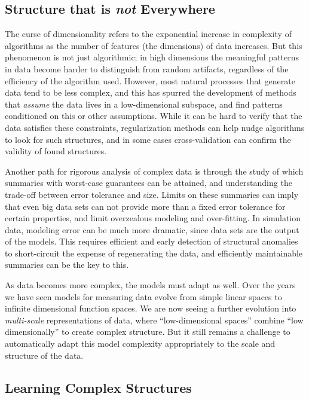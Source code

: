 \documentclass{article}
\begin{document}
\subsection*{Structure that is \emph{not} Everywhere}

The curse of dimensionality refers to the exponential increase in complexity of algorithms as the number of features (the dimensions) of data increases.  But this phenomenon is not just algorithmic; in high dimensions the meaningful patterns in data become harder to distinguish from random artifacts, regardless of the efficiency of the algorithm used.  
However, most natural processes that generate data tend to be less complex, and this has spurred the development of methods that \emph{assume} the data lives in a low-dimensional subspace, and find patterns conditioned on this or other assumptions.  While it can be hard to verify that the data satisfies these constraints, regularization methods can help nudge algorithms to look for such structures, and in some cases cross-validation can confirm the validity of found structures.  

Another path for rigorous analysis of complex data is through the study of which summaries with worst-case guarantees can be attained, and understanding the trade-off between error tolerance and size.  Limits on these summaries can imply that even big data sets can not provide more than a fixed error tolerance for certain properties, and limit overzealous modeling and over-fitting.  In simulation data, modeling error can be much more dramatic, since data sets are the output of the models.  This requires efficient and early detection of structural anomalies to short-circuit the expense of regenerating the data, and efficiently maintainable summaries can be the key to this.  

As data becomes more complex, the models must adapt as well. Over the years we have seen models for measuring data evolve from simple linear spaces to infinite dimensional function spaces. We are now seeing a further evolution into \emph{multi-scale} representations of
data, where ``low-dimensional spaces'' combine ``low dimensionally'' to create complex structure.  But it still remains a challenge to automatically adapt this model complexity appropriately to the scale and structure of the data.  


\subsection*{Learning Complex Structures}
\label{sec:machine-learning}
\end{document}
